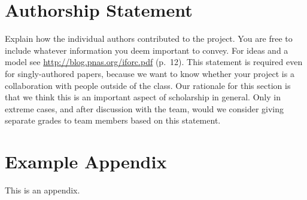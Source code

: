 \documentclass[11pt]{article}
\begin{document}
\section*{Authorship Statement}

Explain how the individual authors contributed to the
project. You are free to include whatever information you deem important to convey. For ideas and a model see \url{http://blog.pnas.org/iforc.pdf} (p.~12).
This statement is required even for singly-authored papers, because we want to know whether your project is a collaboration with people outside of the class. Our rationale for this section is that we think this is an important aspect of scholarship in general. Only in extreme cases, and after discussion with the team, would we consider giving separate grades to team members based on this statement.



\appendix

\section{Example Appendix}\label{sec:appendix}

This is an appendix.
\end{document}
